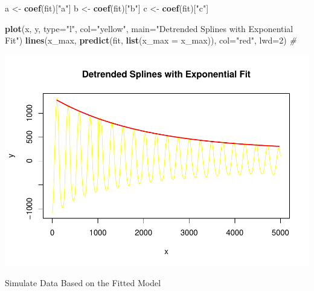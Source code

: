 \documentclass[
]{article}
\newenvironment{Shaded}{\begin{snugshade}}{\end{snugshade}}
\newcommand{\AttributeTok}[1]{\textcolor[rgb]{0.13,0.29,0.53}{#1}}
\newcommand{\CommentTok}[1]{\textcolor[rgb]{0.56,0.35,0.01}{\textit{#1}}}
\newcommand{\DecValTok}[1]{\textcolor[rgb]{0.00,0.00,0.81}{#1}}
\newcommand{\FunctionTok}[1]{\textcolor[rgb]{0.13,0.29,0.53}{\textbf{#1}}}
\newcommand{\NormalTok}[1]{#1}
\newcommand{\OtherTok}[1]{\textcolor[rgb]{0.56,0.35,0.01}{#1}}
\newcommand{\StringTok}[1]{\textcolor[rgb]{0.31,0.60,0.02}{#1}}
\begin{document}
\begin{Shaded}
\begin{Highlighting}[]
\NormalTok{a }\OtherTok{\textless{}{-}} \FunctionTok{coef}\NormalTok{(fit)[}\StringTok{"a"}\NormalTok{]}
\NormalTok{b }\OtherTok{\textless{}{-}} \FunctionTok{coef}\NormalTok{(fit)[}\StringTok{"b"}\NormalTok{]}
\NormalTok{c }\OtherTok{\textless{}{-}} \FunctionTok{coef}\NormalTok{(fit)[}\StringTok{"c"}\NormalTok{]}

\FunctionTok{plot}\NormalTok{(x, y, }\AttributeTok{type=}\StringTok{"l"}\NormalTok{, }\AttributeTok{col=}\StringTok{"yellow"}\NormalTok{, }\AttributeTok{main=}\StringTok{"Detrended Splines with Exponential Fit"}\NormalTok{)}
\FunctionTok{lines}\NormalTok{(x\_max, }\FunctionTok{predict}\NormalTok{(fit, }\FunctionTok{list}\NormalTok{(}\AttributeTok{x\_max =}\NormalTok{ x\_max)), }\AttributeTok{col=}\StringTok{"red"}\NormalTok{, }\AttributeTok{lwd=}\DecValTok{2}\NormalTok{)  }\CommentTok{\#}
\end{Highlighting}
\end{Shaded}

\includegraphics{CircadianProjectForMcManus_files/figure-latex/unnamed-chunk-4-1.pdf}

Simulate Data Based on the Fitted Model
\end{document}
